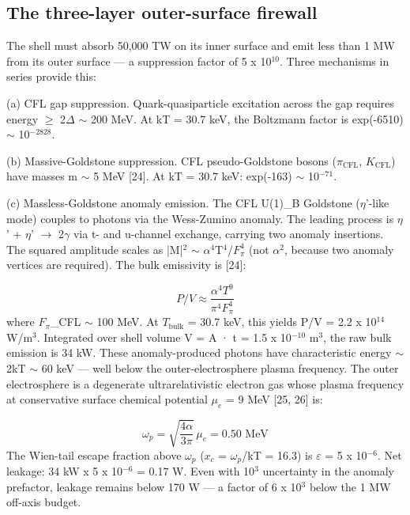 \documentclass[12pt,a4paper]{article}
\begin{document}
\subsection{The three-layer outer-surface firewall}
The shell must absorb 50,000 TW on its inner surface and emit less than 1 MW from its outer surface --- a suppression factor of 5 x 10$^{10}$. Three mechanisms in series provide this:

(a) CFL gap suppression. Quark-quasiparticle excitation across the gap requires energy $\geq$ 2$\Delta$ $\sim$ 200 MeV. At kT = 30.7 keV, the Boltzmann factor is exp(-6510) $\sim$ 10$^{-2828}$.

(b) Massive-Goldstone suppression. CFL pseudo-Goldstone bosons ($\pi_{\text{CFL}}$, $K_{\text{CFL}}$) have masses m $\sim$ 5 MeV [24]. At kT = 30.7 keV: exp(-163) $\sim$ 10$^{-71}$.

(c) Massless-Goldstone anomaly emission. The CFL U(1)\_B Goldstone ($\eta$'-like mode) couples to photons via the Wess-Zumino anomaly. The leading process is $\eta$' + $\eta$' $\to$ 2$\gamma$ via t- and u-channel exchange, carrying two anomaly insertions. The squared amplitude scales as |M|$^{2}$ $\sim$ $\alpha ^{4}$T$^{4}$/$F_{\pi} ^{4}$ (not $\alpha ^{2}$, because two anomaly vertices are required). The bulk emissivity is [24]:

\begin{equation}
P/V \approx \frac{\alpha^4 T^9}{\pi^4 F_\pi^4}
\end{equation}
where $F_{\pi}$\_CFL $\sim$ 100 MeV. At $T_{\text{bulk}}$ = 30.7 keV, this yields P/V = 2.2 x 10$^{14}$ W/m$^{3}$. Integrated over shell volume V = A · t = 1.5 x 10$^{-10}$ m$^{3}$, the raw bulk emission is 34 kW. These anomaly-produced photons have characteristic energy $\sim$2kT $\sim$ 60 keV --- well below the outer-electrosphere plasma frequency. The outer electrosphere is a degenerate ultrarelativistic electron gas whose plasma frequency at conservative surface chemical potential $\mu_e$ = 9 MeV [25, 26] is:

\begin{equation}
\omega_p = \sqrt{\frac{4\alpha}{3\pi}} \, \mu_e = 0.50 \text{ MeV}
\end{equation}
The Wien-tail escape fraction above $\omega_p$ ($x_c$ = $\omega_p$/kT = 16.3) is $\varepsilon$ = 5 x 10$^{-6}$. Net leakage: 34 kW x 5 x 10$^{-6}$ = 0.17 W. Even with 10$^{3}$ uncertainty in the anomaly prefactor, leakage remains below 170 W --- a factor of 6 x 10$^{3}$ below the 1 MW off-axis budget.
\end{document}
